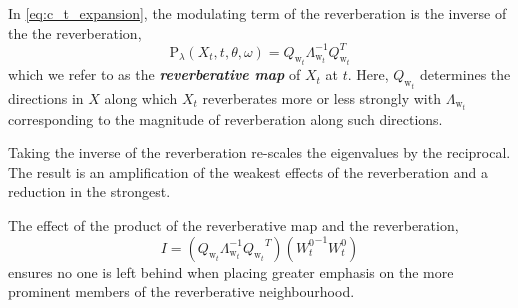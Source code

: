 \documentclass{article}
\newcommand{\W}{\text{w}}
\newcommand{\Rho}{\mathrm{P}}
\begin{document}
In \ref{eq:c_t_expansion}, the modulating term of the reverberation is the inverse of the the reverberation, 
$$
 \Rho_\lambda(X_t, t, \theta, \omega) = Q_{\W_t} \Lambda_{\W_t}^{-1} Q_{\W_t}^T
$$
which we refer to as the \textit{\textbf{reverberative map}} of $X_t$ at $t$. Here, $Q_{\W_t}$ determines the directions in $X$ along which $X_t$ reverberates more or less strongly with $\Lambda_{\W_t}$ corresponding to the magnitude of reverberation along such directions.

Taking the inverse of the reverberation re-scales the eigenvalues by the reciprocal. The result is an amplification of the weakest effects of the reverberation and a reduction in the strongest. 

The effect of the product of the reverberative map and the reverberation,
$$
    I = (Q_{\W_t} \Lambda_{\W_t}^{-1} {Q_{\W_t}}^T) ({W_t^0}^{-1} {W_t^0})
$$
ensures no one is left behind when placing greater emphasis on the more prominent members of the reverberative neighbourhood.
\end{document}
